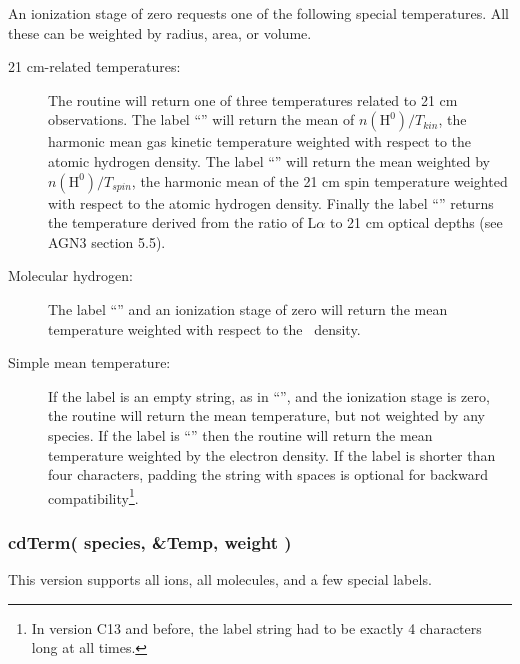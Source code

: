 An ionization stage of zero requests one of the following special
temperatures. All these can be weighted by radius, area, or volume.
\begin{description}
\item[21 cm-related temperatures:]  The routine will return one of three
temperatures related to 21 cm observations.
The label ``\cdTerm{21cm}'' will return
the mean of $n(\mathrm{H}^0)/T_{kin}$, the harmonic mean gas kinetic temperature weighted
with respect to the atomic hydrogen density.
The label ``'' will return the mean weighted by
$n(\mathrm{H}^0)/T_{spin}$, the harmonic mean of the 21 cm spin temperature weighted with
respect to the atomic hydrogen density.
Finally the label ``'' returns the
temperature derived from the ratio of L$\alpha $ to 21
cm optical depths (see AGN3 section 5.5).

\item[Molecular hydrogen:]  The label ``''
and an ionization stage of zero will return the mean temperature
weighted with respect to the \htwo\ density.

\item[Simple mean temperature:]  If the label is an empty string, as in
``'', and the ionization stage is zero, the routine will return the
mean temperature, but not weighted by any
species. If the label is ``'' then the routine will return
the mean temperature weighted by the electron density.
If the label is shorter than four characters, padding the
string with spaces is optional for backward compatibility\footnote{In
  version C13 and before, the label string had to be exactly 4 characters
  long at all times.}.
\end{description}

\subsubsection{cdTerm( species, \&Temp, weight ) }

This version supports all ions, all molecules, and a few special labels.

